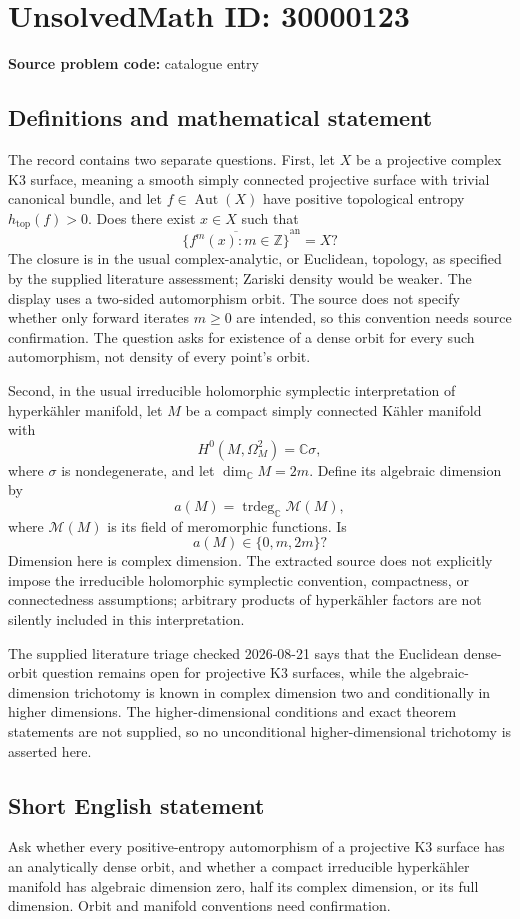 \documentclass[11pt]{article}
\newcommand{\Z}{\mathbb{Z}}
\newcommand{\C}{\mathbb{C}}
\begin{document}
\section*{UnsolvedMath ID: 30000123}
\textbf{Source problem code:} catalogue entry
\subsection{Definitions and mathematical statement}
The record contains two separate questions. First, let \(X\) be a projective complex K3 surface, meaning a smooth simply connected projective surface with trivial canonical bundle, and let \(f\in\operatorname{Aut}(X)\) have positive topological entropy \(h_{\mathrm{top}}(f)>0\). Does there exist \(x\in X\) such that
\[
\overline{\{f^m(x):m\in\Z\}}^{\mathrm{an}}=X?
\]
The closure is in the usual complex-analytic, or Euclidean, topology, as specified by the supplied literature assessment; Zariski density would be weaker. The display uses a two-sided automorphism orbit. The source does not specify whether only forward iterates \(m\geq0\) are intended, so this convention needs source confirmation. The question asks for existence of a dense orbit for every such automorphism, not density of every point's orbit.

Second, in the usual irreducible holomorphic symplectic interpretation of hyperk\"ahler manifold, let \(M\) be a compact simply connected K\"ahler manifold with
\[
H^0(M,\Omega_M^2)=\C\sigma,
\]
where \(\sigma\) is nondegenerate, and let \(\dim_{\C}M=2m\). Define its algebraic dimension by
\[
a(M)=\operatorname{trdeg}_{\C}\mathcal M(M),
\]
where \(\mathcal M(M)\) is its field of meromorphic functions. Is
\[
a(M)\in\{0,m,2m\}?
\]
Dimension here is complex dimension. The extracted source does not explicitly impose the irreducible holomorphic symplectic convention, compactness, or connectedness assumptions; arbitrary products of hyperk\"ahler factors are not silently included in this interpretation.

The supplied literature triage checked 2026-08-21 says that the Euclidean dense-orbit question remains open for projective K3 surfaces, while the algebraic-dimension trichotomy is known in complex dimension two and conditionally in higher dimensions. The higher-dimensional conditions and exact theorem statements are not supplied, so no unconditional higher-dimensional trichotomy is asserted here.
\subsection{Short English statement}
Ask whether every positive-entropy automorphism of a projective K3 surface has an analytically dense orbit, and whether a compact irreducible hyperk\"ahler manifold has algebraic dimension zero, half its complex dimension, or its full dimension. Orbit and manifold conventions need confirmation.
\end{document}
